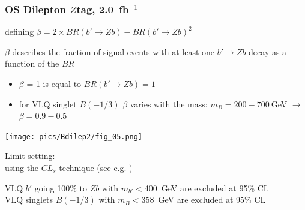 \documentclass[xcolor=dvipsnames,10pt]{beamer}
\newcommand{\ifb}{~fb$^{-1}$}
\begin{document}
\begin{frame}\frametitle{OS Dilepton $Z$tag, 2.0\ifb~\cite{:2012aka}} %
\footnotesize\centering

\begin{minipage}{.4\textwidth}
\centering

defining $\beta = 2\times BR(b'\rightarrow Zb) - BR(b'\rightarrow Zb)^2$

\vspace{\baselineskip}

\scriptsize 
$\beta$ describes the \alert{fraction of signal events} with at least one $b'\rightarrow Zb$ decay as a function of the $BR$
\begin{itemize}
\item $\beta$ = 1 is equal to $BR(b'\rightarrow Zb) = 1$
\item for VLQ singlet $B(-1/3)$ $\beta$ varies with the mass: $m_B = 200-700~$GeV $\rightarrow$ $\beta=0.9-0.5$ 
\end{itemize}

\end{minipage}\begin{minipage}{.6\textwidth}
\centering

\texttt{[image: pics/Bdilep2/fig\_05.png]}
\end{minipage}

Limit setting:\\
using the $CL_s$ technique (see e.g. \cite{Junk:1999kv,Read:2002hq})\\

\vspace{\baselineskip}

VLQ $b'$ going 100\% to $Zb$ with $m_{b'}<$\alert{400~GeV} are excluded at 95\% CL\\
VLQ singlets $B(-1/3)$ with $m_B<$\alert{358~GeV} are excluded at 95\% CL\\

\end{frame}
\end{document}
